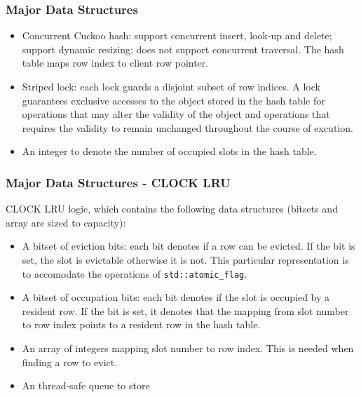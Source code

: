 \documentclass{beamer}
\begin{document}
\begin{frame}
\frametitle{Major Data Structures}
\begin{itemize}
\item Concurrent Cuckoo hash: support concurrent insert, look-up and delete; 
support dynamic resizing; does not support concurrent traversal. The hash table
maps row index to client row pointer.
\item Striped lock: each lock guards a disjoint subset of row indices. A lock 
guarantees exclusive accesses to the object stored in the hash table for operations
that may alter the validity of the object and operations that requires the validity 
to remain unchanged throughout the course of excution.
\item An integer to denote the number of occupied slots in the hash table.
\end{itemize}
\end{frame}

\begin{frame}
\frametitle{Major Data Structures - CLOCK LRU}
CLOCK LRU logic, which contains the following data structures (bitsets and
 array are sized to capacity):
\begin{itemize}
\item A bitset of eviction bits: each bit denotes if a row can be evicted. If 
the bit is set, the slot is evictable otherwise it is not. This particular 
representation is to accomodate the operations of \texttt{std::atomic\_flag}.
\item A bitset of occupation bits: each bit denotes if the slot is occupied by a
resident row. If the bit is set, it denotes that the mapping from slot number
to row index points to a resident row in the hash table.
\item An array of integers mapping slot number to row index. This is needed when
finding a row to evict.
\item An thread-safe queue to store 
\end{itemize}

\end{frame}
\end{document}
